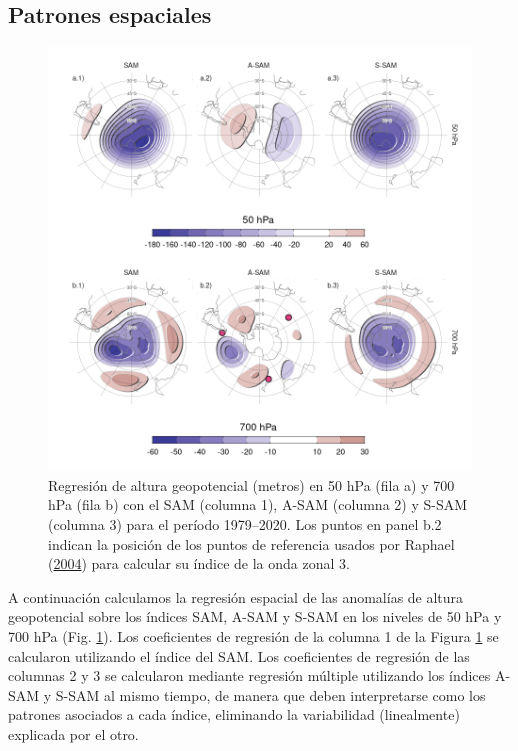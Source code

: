 \documentclass[12pt,oneside,a4paper]{reedthesis}
\begin{document}
\hypertarget{spatial}{%
\subsection{Patrones espaciales}\label{spatial}}



\begin{figure}

{\centering \includegraphics{figures/30-sam/2d-regr-1} 

}

\caption{Regresión de altura geopotencial (metros) en 50 hPa (fila a) y 700 hPa (fila b) con el SAM (columna 1), A-SAM (columna 2) y S-SAM (columna 3) para el período 1979--2020. Los puntos en panel b.2 indican la posición de los puntos de referencia usados por Raphael (\protect\hyperlink{ref-raphael2004}{2004}) para calcular su índice de la onda zonal 3.}\label{fig:2d-regr}
\end{figure}

A continuación calculamos la regresión espacial de las anomalías de altura geopotencial sobre los índices SAM, A-SAM y S-SAM en los niveles de 50 hPa y 700 hPa (Fig. \ref{fig:2d-regr}).
Los coeficientes de regresión de la columna 1 de la Figura \ref{fig:2d-regr} se calcularon utilizando el índice del SAM.
Los coeficientes de regresión de las columnas 2 y 3 se calcularon mediante regresión múltiple utilizando los índices A-SAM y S-SAM al mismo tiempo, de manera que deben interpretarse como los patrones asociados a cada índice, eliminando la variabilidad (linealmente) explicada por el otro.
\end{document}
